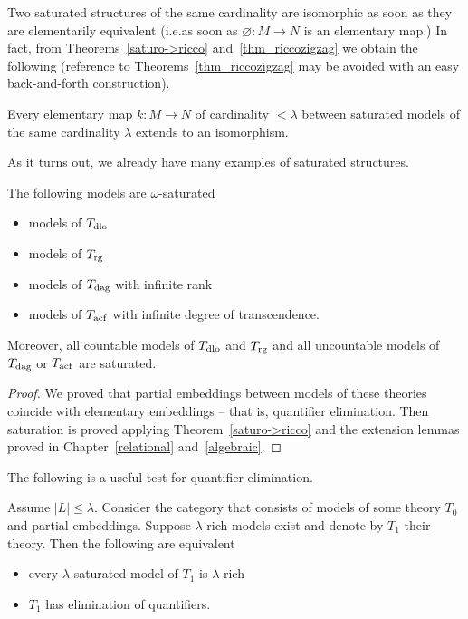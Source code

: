 Two saturated structures of the same cardinality are isomorphic as soon as they are elementarily equivalent (i.e.\@ as soon as $\varnothing:M\to N$ is an elementary map.) In fact, from Theorems~\ref{saturo->ricco} and~\ref{thm_riccozigzag} we obtain the following (reference to Theorems~\ref{thm_riccozigzag} may be avoided with an easy back-and-forth construction).

\begin{corollary}
Every elementary map $k:M\to N$ of cardinality $<\lambda$ between saturated models of the same cardinality $\lambda$ extends to an isomorphism.
\end{corollary}

As it turns out, we already have many examples of saturated structures.

\begin{corollary}
The following models are $\omega\mbox{-}$saturated
\begin{itemize}
\item[1] models of $T_{\rm dlo}$
\item[2] models of $T_{\rm rg}$
\item[3] models of $T_{\rm dag}$ with infinite rank
\item[4] models of $T_{\rm acf}$ with infinite degree of transcendence.
\end{itemize}\smallskip
Moreover, all countable models of $T_{\rm dlo}$ and $T_{\rm rg}$ and all uncountable models of $T_{\rm dag}$ or $T_{\rm acf}$ are saturated. 
\end{corollary}
\begin{proof}
We proved that partial embeddings between models of these theories coincide with elementary embeddings -- that is, quantifier elimination.
Then saturation is proved applying Theorem~\ref{saturo->ricco} and the extension lemmas proved in Chapter~\ref{relational} and~\ref{algebraic}.
\end{proof}

The following is a useful test for quantifier elimination.

\begin{theorem}\label{thm_ricchezza_saturazione_QE}
Assume $|L|\le\lambda$. Consider the category that consists of models of some theory $T_0$ and partial embeddings. Suppose $\lambda\mbox{-}$rich models exist and denote by $T_1$ their theory. Then the following are equivalent
\begin{itemize}
\item[1.] every $\lambda\mbox{-}$saturated model of $T_1$ is $\lambda\mbox{-}$rich
\item[2.] $T_1$ has elimination of quantifiers.
\end{itemize}
\end{theorem}

